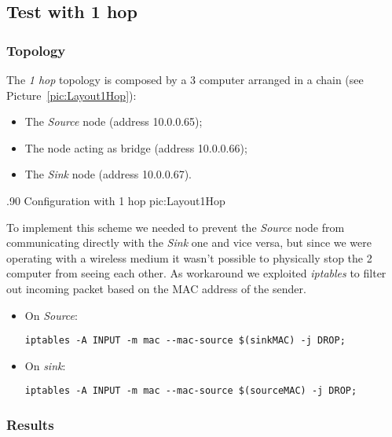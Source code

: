 \subsection{Test with 1 hop}

    \subsubsection{Topology}

        The \emph{1 hop} topology is composed by a 3 computer arranged
        in a chain (see Picture~\ref{pic:Layout1Hop}):
        \begin{itemize}
        \item   The \emph{Source} node (address 10.0.0.65);
        \item   The node acting as bridge (address 10.0.0.66);
        \item   The \emph{Sink} node (address 10.0.0.67).
        \end{itemize}

                {.90\columnwidth}
                {Configuration with 1 hop}
                {pic:Layout1Hop}

        To implement this scheme we needed to prevent the \emph{Source}
        node from communicating directly with the \emph{Sink} one and vice
        versa, but since we were operating with a wireless medium it
        wasn't possible to physically stop the 2 computer from seeing each
        other. As workaround we exploited \emph{iptables} to filter out
        incoming packet based on the MAC address of the sender.

        \begin{itemize}
        \item On \emph{Source}:
            \begin{verbatim}
iptables -A INPUT -m mac --mac-source $(sinkMAC) -j DROP;
            \end{verbatim}

        \item On \emph{sink}:
            \begin{verbatim}
iptables -A INPUT -m mac --mac-source $(sourceMAC) -j DROP;
            \end{verbatim}

        \end{itemize}

    \subsubsection{Results}

